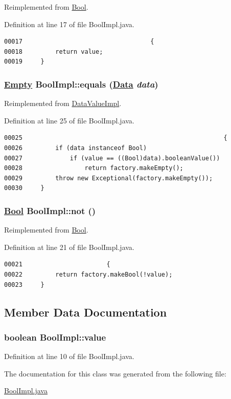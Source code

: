 Reimplemented from \hyperlink{interfaceBool_a0}{Bool}.

Definition at line 17 of file Bool\-Impl.java.\footnotesize\begin{verbatim}00017                                   {
00018         return value;
00019     }
\end{verbatim}\normalsize 
\hypertarget{classBoolImpl_a2}{
\subsubsection[equals]{\setlength{\rightskip}{0pt plus 5cm}\hyperlink{interfaceEmpty}{Empty} Bool\-Impl::equals (\hyperlink{interfaceData}{Data} {\em data})}}
\label{classBoolImpl_a2}




Reimplemented from \hyperlink{classDataValueImpl_a5}{Data\-Value\-Impl}.

Definition at line 25 of file Bool\-Impl.java.\footnotesize\begin{verbatim}00025                                                       {
00026         if (data instanceof Bool)
00027             if (value == ((Bool)data).booleanValue())
00028                 return factory.makeEmpty();
00029         throw new Exceptional(factory.makeEmpty());
00030     }
\end{verbatim}\normalsize 
\hypertarget{classBoolImpl_a1}{
\subsubsection[not]{\setlength{\rightskip}{0pt plus 5cm}\hyperlink{interfaceBool}{Bool} Bool\-Impl::not ()}}
\label{classBoolImpl_a1}




Reimplemented from \hyperlink{interfaceBool_a1}{Bool}.

Definition at line 21 of file Bool\-Impl.java.\footnotesize\begin{verbatim}00021                       {
00022         return factory.makeBool(!value);
00023     }
\end{verbatim}\normalsize 


\subsection{Member Data Documentation}
\hypertarget{classBoolImpl_o0}{
\subsubsection[value]{\setlength{\rightskip}{0pt plus 5cm}boolean Bool\-Impl::value}}
\label{classBoolImpl_o0}




Definition at line 10 of file Bool\-Impl.java.

The documentation for this class was generated from the following file:\begin{CompactItemize}
\item 
\hyperlink{BoolImpl_8java-source}{Bool\-Impl.java}\end{CompactItemize}
